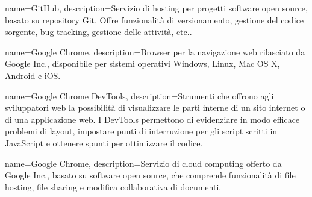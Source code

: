 {
	name=GitHub,
	description={Servizio di hosting per progetti software open source, basato su repository Git. Offre funzionalità di versionamento, gestione del codice sorgente, bug tracking, gestione delle attività, etc..}
}

{
	name=Google Chrome,
	description={Browser per la navigazione web rilasciato da Google Inc., disponibile per sistemi operativi Windows, Linux, Mac OS X, Android e iOS.}
}

{
	name=Google Chrome DevTools,
	description={Strumenti che offrono agli sviluppatori web la possibilità di visualizzare le parti interne di un sito internet o di una applicazione web. I DevTools permettono di evidenziare in modo efficace problemi di layout, impostare punti di interruzione per gli script scritti in JavaScript e ottenere spunti per ottimizzare il codice.}
}

{
	name=Google Chrome,
	description={Servizio di cloud computing offerto da Google Inc., basato su software open source, che comprende funzionalità di file hosting, file sharing e modifica collaborativa di documenti.}
}
